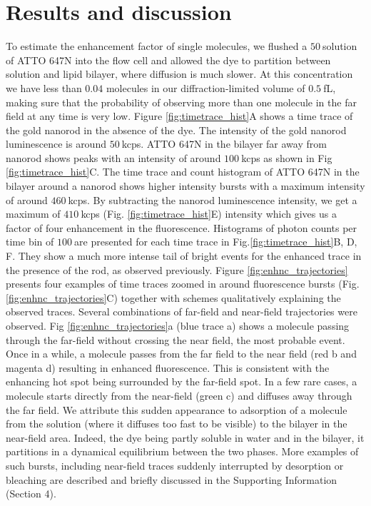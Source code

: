 \section{Results and discussion}
To estimate the enhancement factor of single molecules, we flushed a $50~$\pM solution of ATTO 647N into the flow cell and allowed the dye to partition between solution and lipid bilayer, where diffusion is much slower. At this concentration we have less than $0.04$ molecules in our diffraction-limited volume of $0.5~$fL, making sure that the probability of observing more than one molecule in the far field at any time is very low. Figure \ref{fig:timetrace_hist}A shows a time trace of the gold nanorod in the absence of the dye. The intensity of the gold nanorod luminescence is around $50~$kcps. ATTO 647N in the bilayer far away from nanorod shows peaks with an intensity of around $100~$kcps as shown in Fig \ref{fig:timetrace_hist}C. The time trace and count histogram of ATTO 647N in the bilayer around a nanorod shows higher intensity bursts with a maximum intensity of around $460~$kcps. By subtracting the nanorod luminescence intensity, we get a maximum of $410~$kcps (Fig. \ref{fig:timetrace_hist}E) intensity which gives us a factor of four enhancement in the fluorescence. Histograms of photon counts per time bin of $100~$\us are presented for each time trace in Fig.\ref{fig:timetrace_hist}B, D, F. They show a much more intense tail of bright events for the enhanced trace in the presence of the rod, as observed previously.\cite{khatua2014resonant} Figure \ref{fig:enhnc_trajectories} presents four examples of time traces zoomed in around fluorescence bursts (Fig. \ref{fig:enhnc_trajectories}C) together with schemes qualitatively explaining the observed traces. Several combinations of far-field and near-field trajectories were observed. Fig \ref{fig:enhnc_trajectories}a (blue trace a) shows a molecule passing through the far-field without crossing the near field, the most probable event. Once in a while, a molecule passes from the far field to the near field (red b and magenta d) resulting in enhanced fluorescence. This is consistent with the enhancing hot spot being surrounded by the far-field spot. In a few rare cases, a molecule starts directly from the near-field (green c) and diffuses away through the far field. We attribute this sudden appearance to adsorption of a molecule from the solution (where it diffuses too fast to be visible) to the bilayer in the near-field area. Indeed, the dye being partly soluble in water and in the bilayer, it partitions in a dynamical equilibrium between the two phases. More examples of such bursts, including near-field traces suddenly interrupted by desorption or bleaching are described and briefly discussed in the Supporting Information (Section 4).\\
